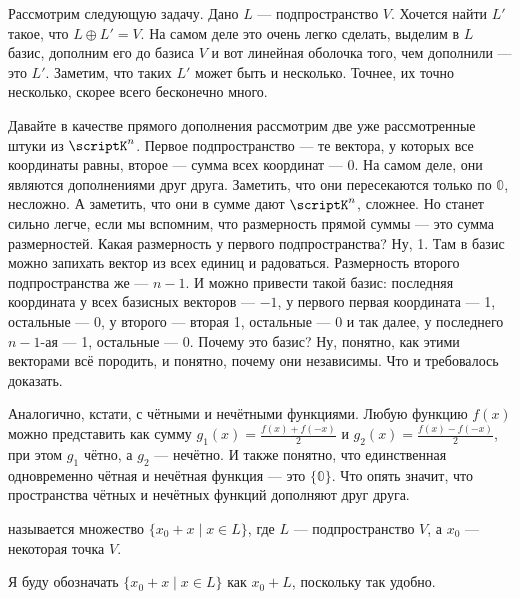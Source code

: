 \documentclass{article}
\begin{document}
\begin{itemize}
        \begin{Example}
            Рассмотрим следующую задачу. Дано $L$ --- подпространство $V$. Хочется найти $L'$ такое, что $L\oplus L'=V$. На самом деле это очень легко сделать, выделим в $L$ базис, дополним его до базиса $V$ и вот линейная оболочка того, чем дополнили --- это $L'$. Заметим, что таких $L'$ может быть и несколько. Точнее, их точно несколько, скорее всего бесконечно много.
        \end{Example}
        \begin{Example}
            Давайте в качестве прямого дополнения рассмотрим две уже рассмотренные штуки из $\scriptK^n$. Первое подпространство --- те вектора, у которых все координаты равны, второе --- сумма всех координат --- 0. На самом деле, они являются дополнениями друг друга. Заметить, что они пересекаются только по $\mathbb0$, несложно. А заметить, что они в сумме дают $\scriptK^n$, сложнее. Но станет сильно легче, если мы вспомним, что размерность прямой суммы --- это сумма размерностей. Какая размерность у первого подпространства? Ну, 1. Там в базис можно запихать вектор из всех единиц и радоваться. Размерность второго подпространства же --- $n-1$. И можно привести такой базис: последняя координата у всех базисных векторов --- $-1$, у первого первая координата --- 1, остальные --- 0, у второго --- вторая 1, остальные --- 0 и так далее, у последнего $n-1$-ая --- 1, остальные --- 0. Почему это базис? Ну, понятно, как этими векторами всё породить, и понятно, почему они независимы. Что и требовалось доказать.
        \end{Example}
        \begin{Example}
            Аналогично, кстати, с чётными и нечётными функциями. Любую функцию $f(x)$ можно представить как сумму $g_1(x)=\frac{f(x)+f(-x)}2$ и $g_2(x)=\frac{f(x)-f(-x)}2$, при этом $g_1$ чётно, а $g_2$ --- нечётно. И также понятно, что единственная одновременно чётная и нечётная функция --- это $\{\mathbb0\}$. Что опять значит, что пространства чётных и нечётных функций дополняют друг друга.
        \end{Example}
        \dfn {} называется множество $\{x_0+x\mid x\in L\}$, где $L$ --- подпространство $V$, а $x_0$ --- некоторая точка $V$.
        \begin{Comment}
            Я буду обозначать $\{x_0+x\mid x\in L\}$ как $x_0+L$, поскольку так удобно.
        \end{Comment}
        \begin{Comment}

\end{Comment}
\end{itemize}
\end{document}
